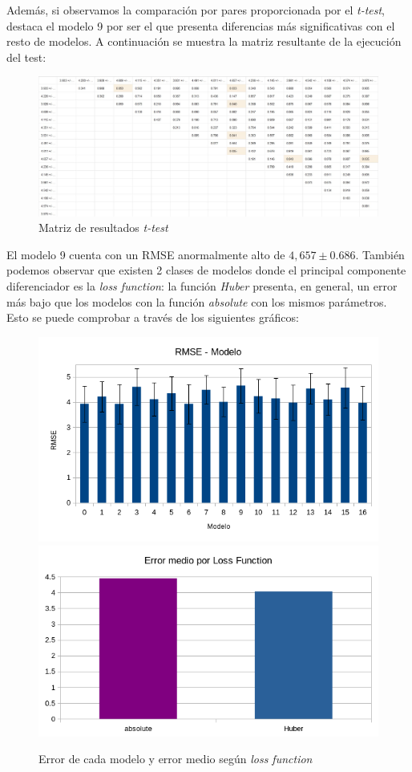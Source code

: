 \documentclass[12pt]{report} %
\begin{document}
    Además, si observamos la comparación por pares proporcionada por el \textit{t-test}, destaca el modelo 9 por ser el que presenta diferencias más significativas con el resto de modelos. A continuación se muestra la matriz resultante de la ejecución del test:

\begin{figure}[H]
    \includegraphics[width=\linewidth]{t-test.jpeg}
    \caption {\small Matriz de resultados \textit{t-test}}
\end{figure}

    El modelo 9 cuenta con un RMSE anormalmente alto de $4,657\pm 0.686$. También podemos observar que existen 2 clases de modelos donde el principal componente diferenciador es la \textit{loss function}: la función \textit{Huber} presenta, en general, un error más bajo que los modelos con la función \textit{absolute} con los mismos parámetros. Esto se puede comprobar a través de los siguientes gráficos:

\begin{figure}[H]
    \includegraphics[width=0.45\linewidth]{RMSE-models.png}
    \includegraphics[width=0.45\linewidth]{error-lossfunction.png}
    \caption{\small Error de cada modelo y error medio según \textit{loss function}}
\end{figure}
\end{document}
